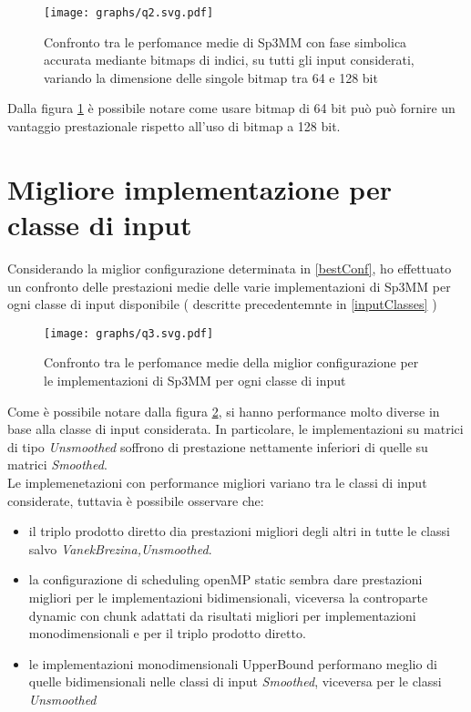 \begin{figure}[H]
  \centering \texttt{[image: graphs/q2.svg.pdf]}
  \caption[SymbAcc: miglior dimensione per le bitmaps]
  {Confronto tra le perfomance medie di Sp3MM con fase simbolica accurata mediante bitmaps di indici,
		   su tutti gli input considerati, variando la dimensione delle singole bitmap tra 64 e 128 bit}
  \decoRule \label{fig:q2}
\end{figure}
Dalla figura \ref{fig:q2} è possibile notare come usare bitmap di 64 bit può può fornire un vantaggio prestazionale
rispetto all'uso di bitmap a 128 bit.

\section{Migliore implementazione per classe di input} \label{chPerf:q3}
Considerando la miglior configurazione determinata in \ref{bestConf}, ho effettuato un confronto delle prestazioni medie
delle varie implementazioni di Sp3MM per ogni classe di input disponibile ( descritte precedentemnte in \ref{inputClasses} )
\begin{figure}[H]	
  \centering \texttt{[image: graphs/q3.svg.pdf]}
  \caption[miglior implementazione per classe di input]
  {Confronto tra le perfomance medie della miglior configurazione per le implementazioni di Sp3MM per ogni classe di input}
  \label{fig:q3}
\end{figure}
Come è possibile notare dalla figura \ref{fig:q3}, si hanno performance molto diverse in base alla classe di input considerata.
In particolare, le implementazioni su matrici di tipo \emph{Unsmoothed} soffrono di prestazione nettamente inferiori di quelle 
su matrici \emph{Smoothed}.\\
Le implemenetazioni con performance migliori variano tra le classi di input considerate, tuttavia è possibile osservare che:
\begin{itemize}		\label{chPerf:inClassPerfOss}
	\item il triplo prodotto diretto dia prestazioni migliori degli altri in tutte le classi salvo \emph{VanekBrezina,Unsmoothed}.
	\item la configurazione di scheduling openMP static sembra dare prestazioni migliori per le implementazioni bidimensionali,
		  viceversa la controparte dynamic con chunk adattati da risultati migliori per implementazioni monodimensionali e per il triplo prodotto diretto.
	\item le implementazioni monodimensionali UpperBound performano meglio di quelle bidimensionali nelle classi di input \emph{Smoothed},
		  viceversa per le classi \emph{Unsmoothed}
\end{itemize}

